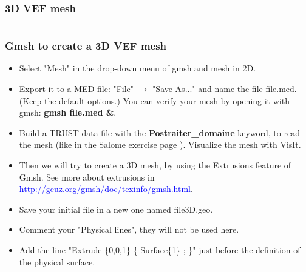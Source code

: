 \documentclass[10pt]{beamer}
\begin{document}
\subsubsection{3D VEF mesh}
\begin{frame}
\begin{columns}[c] 
\tableofcontents[sections={1-7},currentsection, currentsubsection]
\tableofcontents[sections={8-13},currentsection, currentsubsection]
\end{columns}
\end{frame}
\begin{frame}
\frametitle{Gmsh to create a 3D VEF mesh}
\begin{block}{}

\begin{itemize}
\item Select "Mesh" in the drop-down menu of gmsh and mesh in 2D.
\item Export it to a MED file: "File" $\rightarrow$ "Save As..." and name the file file.med. (Keep the default options.) You can verify your mesh by opening it with gmsh: \textbf{gmsh file.med \&}.
\item Build a TRUST data file with the \textbf{Postraiter\_domaine} keyword, to read the mesh (like in the Salome exercise page \pageref{read_mesh}). Visualize the mesh with VisIt.
\item Then we will try to create a 3D mesh, by using the Extrusions feature of Gmsh. See more about extrusions in \textcolor{blue}{\underline{http://geuz.org/gmsh/doc/texinfo/gmsh.html}}.
\item Save your initial file in a new one named file3D.geo.
\item Comment your "Physical lines", they will not be used here.
\item Add the line "Extrude \{0,0,1\} \{ Surface\{1\} ; \}" just before the definition of the physical surface.
\end{itemize}

\end{block}
\end{frame}
\end{document}
